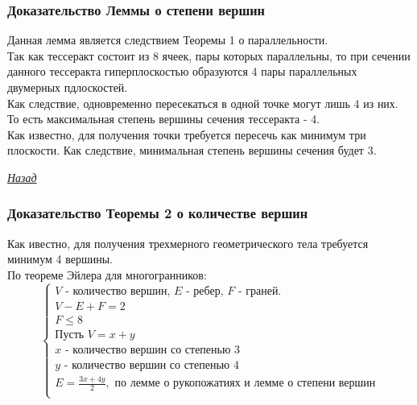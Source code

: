 \documentclass[10pt,pdf,hyperref={unicode}]{beamer}
\begin{document}
\begin{frame}
	\frametitle{Доказательство Леммы о степени вершин}
	\hypertarget{stepen}{}
	Данная лемма является следствием Теоремы 1 о параллельности. \\
	Так как тессеракт состоит из 8 ячеек, пары которых параллельны, то при сечении данного тессеракта гиперплоскостью образуются 4 пары параллельных двумерных пдлоскостей. \\
	Как следствие, одновременно пересекаться в одной точке могут лишь 4 из них. То есть максимальная степень вершины сечения тессеракта - 4. \\
	Как известно, для получения точки требуется пересечь как минимум три плоскости. Как следствие, минимальная степень вершины сечения будет 3.

	{\raggedleft\vfill\itshape\Longstack[l]
	\hyperlink{stepen_back}{Назад} \\
	}\par
\end{frame}
\begin{frame}
	\frametitle{Доказательство Теоремы 2 о количестве вершин}
	\hypertarget{theorem2}{}
	Как ивестно, для получения трехмерного геометрического тела требуется минимум 4 вершины. \\
	По теореме Эйлера для многогранников: 
	\begin{equation*}
	\left\{
		\begin{array}{lc}
		\mbox{$V$ - количество вершин, $E$ - ребер, $F$ - граней.} \\
		V-E+F=2 \\
		F\le8 \\
		\mbox{Пусть }V=x+y \\
		\mbox{$x$ - количество вершин со степенью 3}\\ 
		\mbox{$y$ - количество вершин со степенью 4} \\
		E=\frac{3x+4y}{2}, 
		\mbox{ по лемме о рукопожатиях и лемме о степени вершин}\\
	\end{array}
\end{equation*}
\end{frame}
\end{document}
